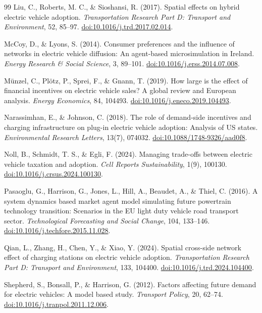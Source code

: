 \documentclass[11pt]{article}
\begin{document}
\begin{thebibliography}{99}
Liu, C., Roberts, M. C., \& Sioshansi, R. (2017).
Spatial effects on hybrid electric vehicle adoption.
\emph{Transportation Research Part D: Transport and Environment}, 52, 85--97.
\href{https://doi.org/10.1016/j.trd.2017.02.014}{doi:10.1016/j.trd.2017.02.014}.

McCoy, D., \& Lyons, S. (2014).
Consumer preferences and the influence of networks in electric vehicle
diffusion: An agent-based microsimulation in Ireland.
\emph{Energy Research \& Social Science}, 3, 89--101.
\href{https://doi.org/10.1016/j.erss.2014.07.008}{doi:10.1016/j.erss.2014.07.008}.

M\"{u}nzel, C., Pl\"{o}tz, P., Sprei, F., \& Gnann, T. (2019).
How large is the effect of financial incentives on electric vehicle sales? A
global review and European analysis.
\emph{Energy Economics}, 84, 104493.
\href{https://doi.org/10.1016/j.eneco.2019.104493}{doi:10.1016/j.eneco.2019.104493}.

Narassimhan, E., \& Johnson, C. (2018).
The role of demand-side incentives and charging infrastructure on plug-in
electric vehicle adoption: Analysis of US states.
\emph{Environmental Research Letters}, 13(7), 074032.
\href{https://doi.org/10.1088/1748-9326/aad0f8}{doi:10.1088/1748-9326/aad0f8}.

Noll, B., Schmidt, T. S., \& Egli, F. (2024).
Managing trade-offs between electric vehicle taxation and adoption.
\emph{Cell Reports Sustainability}, 1(9), 100130.
\href{https://doi.org/10.1016/j.crsus.2024.100130}{doi:10.1016/j.crsus.2024.100130}.

Pasaoglu, G., Harrison, G., Jones, L., Hill, A., Beaudet, A., \& Thiel, C. (2016).
A system dynamics based market agent model simulating future powertrain
technology transition: Scenarios in the EU light duty vehicle road transport
sector.
\emph{Technological Forecasting and Social Change}, 104, 133--146.
\href{https://doi.org/10.1016/j.techfore.2015.11.028}{doi:10.1016/j.techfore.2015.11.028}.

Qian, L., Zhang, H., Chen, Y., \& Xiao, Y. (2024).
Spatial cross-side network effect of charging stations on electric vehicle
adoption.
\emph{Transportation Research Part D: Transport and Environment}, 133, 104400.
\href{https://doi.org/10.1016/j.trd.2024.104400}{doi:10.1016/j.trd.2024.104400}.

Shepherd, S., Bonsall, P., \& Harrison, G. (2012).
Factors affecting future demand for electric vehicles: A model based study.
\emph{Transport Policy}, 20, 62--74.
\href{https://doi.org/10.1016/j.tranpol.2011.12.006}{doi:10.1016/j.tranpol.2011.12.006}.


\end{thebibliography}
\end{document}
